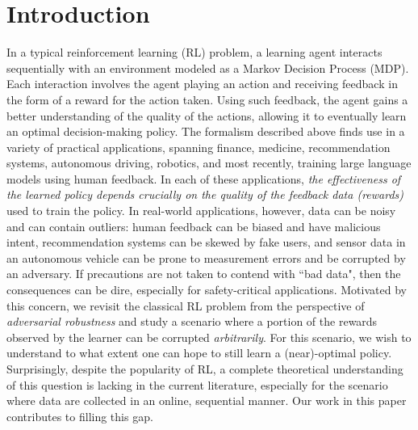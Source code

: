 \documentclass{article}
\begin{document}
\section{Introduction}
In a typical reinforcement learning (RL) problem, a learning agent interacts sequentially with an environment modeled as a Markov Decision Process (MDP). Each interaction involves the agent playing an action and receiving feedback in the form of a reward for the action taken. Using such feedback, the agent gains a better understanding of the quality of the actions, allowing it to eventually learn an optimal decision-making policy. The formalism described above finds use in a variety of practical applications, spanning finance, medicine, recommendation systems, autonomous driving, robotics, and most recently, training large language models using human feedback. In each of these applications, \emph{the effectiveness of the learned policy depends crucially on the quality of the feedback data (rewards)} used to train the policy. In real-world applications, however, data can be noisy and can contain outliers: human feedback can be biased and have malicious intent, recommendation systems can be skewed by fake users, and sensor data in an autonomous vehicle can be prone to measurement errors and be corrupted by an adversary. If precautions are not taken to contend with ``bad data", then the consequences can be dire, especially for safety-critical applications. Motivated by this concern, we revisit the classical RL problem from the perspective of \emph{adversarial robustness} and study a scenario where a portion of the rewards observed by the learner can be corrupted \emph{arbitrarily}. For this scenario, we wish to understand to what extent one can hope to still learn a (near)-optimal policy. Surprisingly, despite the popularity of RL, a complete theoretical understanding of this question is lacking in the current literature, especially for the scenario where data are collected in an online, sequential manner. Our work in this paper contributes to filling this gap.  
\end{document}
